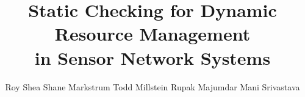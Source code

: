 \documentclass{acm_proc_article-sp}
\begin{document}
\title{Static Checking for Dynamic Resource Management \\ in Sensor
  Network Systems}


\author{
\alignauthor Roy Shea \hspace{.125in} Shane Markstrum \hspace{.125in} Todd
Millstein \hspace{.125in} Rupak Majumdar \hspace{.125in} Mani Srivastava\\
       \\
       \\
}


\maketitle









{\small 



}
\end{document}
